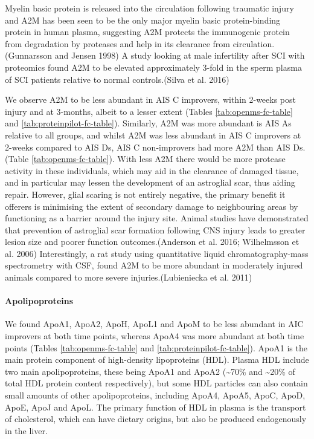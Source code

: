\documentclass[9pt,lineno]{elife}
\begin{document}
\begin{landscape}
\begin{landscape}
Myelin basic protein is released into the circulation following traumatic injury and A2M has been seen to be the only major myelin basic protein-binding protein in human plasma, suggesting A2M protects the immunogenic protein from degradation by proteases and help in its clearance from circulation.(Gunnarsson and Jensen 1998) A study looking at male infertility after SCI with proteomics found A2M to be elevated approximately 3-fold in the sperm plasma of SCI patients relative to normal controls.(Silva et al. 2016)

We observe A2M to be less abundant in AIS C improvers, within 2-weeks post injury and at 3-months, albeit to a lesser extent (Tables \ref{tab:openms-fc-table} and \ref{tab:proteinpilot-fc-table}).
Similarly, A2M was more abundant is AIS As relative to all groups, and whilst A2M was less abundant in AIS C improvers at 2-weeks compared to AIS Ds, AIS C non-improvers had more A2M than AIS Ds.
(Table \ref{tab:openms-fc-table}).
With less A2M there would be more protease activity in these individuals, which may aid in the clearance of damaged tissue, and in particular may lessen the development of an astroglial scar, thus aiding repair.
However, glial scaring is not entirely negative, the primary benefit it offerers is minimising the extent of secondary damage to neighbouring areas by functioning as a barrier around the injury site.
Animal studies have demonstrated that prevention of astroglial scar formation following CNS injury leads to greater lesion size and poorer function outcomes.(Anderson et al. 2016; Wilhelmsson et al. 2006) Interestingly, a rat study using quantitative liquid chromatography-mass spectrometry with CSF, found A2M to be more abundant in moderately injured animals compared to more severe injuries.(Lubieniecka et al. 2011)

\hypertarget{apolipoproteins}{%
\paragraph{Apolipoproteins}\label{apolipoproteins}}

We found ApoA1, ApoA2, ApoH, ApoL1 and ApoM to be less abundant in AIC improvers at both time points, whereas ApoA4 was more abundant at both time points (Tables \ref{tab:openms-fc-table} and \ref{tab:proteinpilot-fc-table}).
ApoA1 is the main protein component of high-density lipoproteins (HDL).
Plasma HDL include two main apolipoproteins, these being ApoA1 and ApoA2 (\textasciitilde70\% and \textasciitilde20\% of total HDL protein content respectively), but some HDL particles can also contain small amounts of other apolipoproteins, including ApoA4, ApoA5, ApoC, ApoD, ApoE, ApoJ and ApoL.
The primary function of HDL in plasma is the transport of cholesterol, which can have dietary origins, but also be produced endogenously in the liver.


\end{landscape}
\end{landscape}
\end{document}

